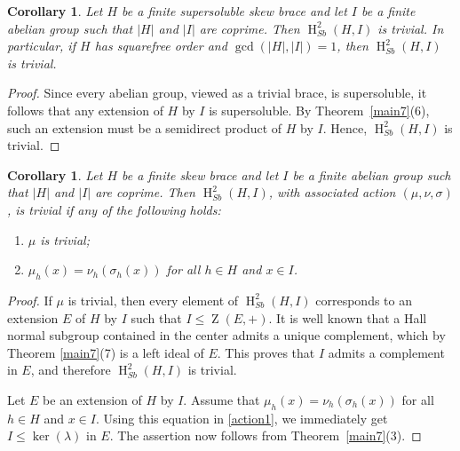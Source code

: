 \documentclass[11pt]{amsart}
\theoremstyle{thrm}
\theoremstyle{plain}
\newtheorem{cor}[thm]{Corollary}
\theoremstyle{definition}
\newcommand{\Ho}{\operatorname{H} }
\newcommand{\Z}{\operatorname{Z} }
\newcommand{\Ker}{\operatorname{ker} }
\numberwithin{equation}{section}
\begin{document}
\begin{cor}
Let $H$ be a finite supersoluble skew brace and let $I$ be a finite  abelian group such that 
$|H|$ and $|I|$ are coprime. Then $\Ho^2_{Sb}(H, I)$ is trivial. 
In particular, if $H$ has squarefree order and $\gcd(|H|,|I|)=1$, then 
$\Ho^2_{Sb}(H, I)$ is trivial.
\end{cor}
\begin{proof}
	Since every abelian group, viewed as a trivial brace, is supersoluble, it follows that any extension of $H$ by $I$ is supersoluble. By Theorem~\ref{main7}(6), such an extension must be a semidirect product of $H$ by $I$. Hence, $\Ho^2_{Sb}(H, I)$ is trivial.
\end{proof}

\begin{cor}
	Let $H$ be a  finite skew brace and let $I$ be a finite abelian group such that 
$|H|$ and $|I|$ are coprime. Then  $\Ho^2_{Sb}(H, I)$,  with associated action $(\mu, \nu, \sigma)$,  is trivial if any of the following holds:
	\begin{enumerate}
		\item  $\mu$ is trivial;
		\item $\mu_h(x) = \nu_h(\sigma_h(x))$ for all $h \in H$ and $x \in I$.
	\end{enumerate}
\end{cor}

\begin{proof}
	If $\mu$ is trivial, then every element of $\Ho^2_{Sb}(H, I)$ corresponds to an extension $E$ of $H$ by $I$ such that $I \leq \Z(E, +)$. It is well known that a Hall normal subgroup contained in the center admits a unique complement, which by Theorem \ref{main7}(7) is a left ideal of $E$.  This proves that $I$ admits a complement in $E$, and therefore  $\Ho^2_{Sb}(H, I)$ is trivial.
		
Let  $E$ be an extension of $H$ by $I$. Assume that  $\mu_h(x) = \nu_h(\sigma_h(x))$ for all $h \in H$ and $x \in I$. Using this equation in \eqref{action1}, we immediately get $I \le \Ker(\lambda)$ in $E$. The assertion now follows from  Theorem~\ref{main7}(3).
\end{proof}
\end{document}
